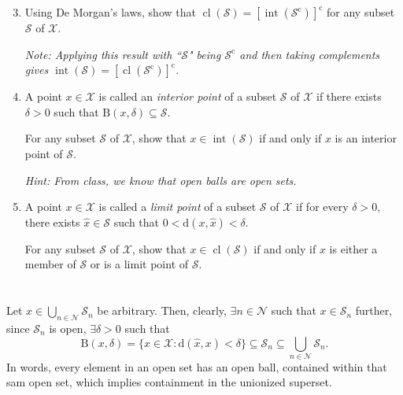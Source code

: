 \documentclass[12 pt,letterpaper]{article}
\newcommand{\calS}{\mathcal{S}}
\newcommand{\calX}{\mathcal{X}}
\newcommand{\rmB}{\mathrm{B}}
\newcommand{\rmc}{\mathrm{c}}
\newcommand{\rmd}{\mathrm{d}}
\newcommand{\inte}{\operatorname{int}}
\newcommand{\cl}{\operatorname{cl}}
\begin{document}
\begin{enumerate}
\setcounter{enumi}{2}
\item
Using De Morgan's laws,
show that $\cl(\calS)=[\inte(\calS^\rmc)]^\rmc$ for any subset $\calS$ of $\calX$.

\textit{Note: Applying this result with ``$\calS$" being $\calS^\rmc$ and then taking complements gives $\inte(\calS)=[\cl(\calS^\rmc)]^\rmc$.}

\item
A point $x\in\calX$ is called an \textit{interior point} of a subset $\calS$ of $\calX$ if there exists $\delta>0$ such that $\rmB(x,\delta)\subseteq\calS$.

For any subset $\calS$ of $\calX$,
show that $x\in\inte(\calS)$ if and only if $x$ is an interior point of $\calS$.

\textit{Hint: From class, we know that open balls are open sets.}

\item
A point $x\in\calX$ is called a \textit{limit point} of a subset $\calS$ of $\calX$ if for every $\delta>0$, there exists $\hat{x}\in\calS$ such that $0<\rmd(x,\hat{x})<\delta$.

For any subset $\calS$ of $\calX$, show that $x\in\cl(\calS)$ if and only if $x$ is either a member of $\calS$ or is a limit point of $\calS$.

\end{enumerate}

\clearpage
\section{}
Let \(x\in\underset{n\in\mathcal{N}}{\bigcup} \mathcal{S}_n\) be arbitrary.
Then, clearly, \(\exists n\in\mathcal{N}\) such that \(x\in \mathcal{S}_n\)
further, since \(\mathcal{S}_n\) is open, \(\exists\delta>0\) such that
\[
    \text{B}(x,\delta) =\{\hat{x}\in\mathcal{X}:\text{d}(\hat{x},x)<\delta\}
    \subseteq \mathcal{S}_n
    \subseteq \bigcup_{n\in\mathcal{N}} \mathcal{S}_n.
\]
In words, every element in an open set has an open ball,
contained within that sam open set, which implies containment
in the unionized superset.

\section{}
\end{document}

